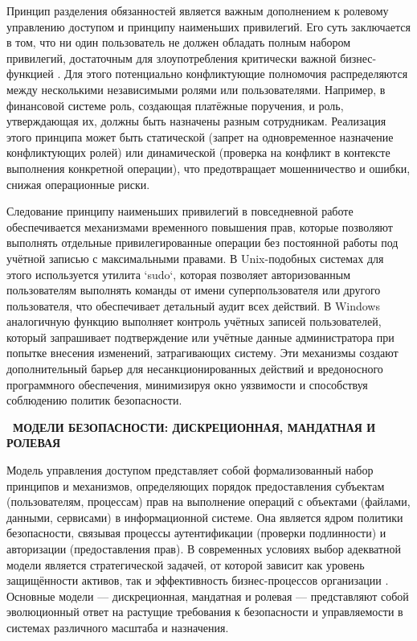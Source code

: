 \documentclass{SibFU-docs}
\begin{document}

Принцип разделения обязанностей является важным дополнением к ролевому управлению доступом и принципу наименьших привилегий. Его суть заключается в том, что ни один пользователь не должен обладать полным набором привилегий, достаточным для злоупотребления критически важной бизнес-функцией \cite{botha2004separation}. Для этого потенциально конфликтующие полномочия распределяются между несколькими независимыми ролями или пользователями. Например, в финансовой системе роль, создающая платёжные поручения, и роль, утверждающая их, должны быть назначены разным сотрудникам. Реализация этого принципа может быть статической (запрет на одновременное назначение конфликтующих ролей) или динамической (проверка на конфликт в контексте выполнения конкретной операции), что предотвращает мошенничество и ошибки, снижая операционные риски.


Следование принципу наименьших привилегий в повседневной работе обеспечивается механизмами временного повышения прав, которые позволяют выполнять отдельные привилегированные операции без постоянной работы под учётной записью с максимальными правами. В Unix-подобных системах для этого используется утилита `sudo`, которая позволяет авторизованным пользователям выполнять команды от имени суперпользователя или другого пользователя, что обеспечивает детальный аудит всех действий. В Windows аналогичную функцию выполняет контроль учётных записей пользователей, который запрашивает подтверждение или учётные данные администратора при попытке внесения изменений, затрагивающих систему. Эти механизмы создают дополнительный барьер для несанкционированных действий и вредоносного программного обеспечения, минимизируя окно уязвимости и способствуя соблюдению политик безопасности.

\newpage
{}
\begin{center}\textbf{\thesection\ МОДЕЛИ БЕЗОПАСНОСТИ: ДИСКРЕЦИОННАЯ, МАНДАТНАЯ И РОЛЕВАЯ}\end{center}
\vspace*{-1.5em}

Модель управления доступом представляет собой формализованный набор принципов и механизмов, определяющих порядок предоставления субъектам (пользователям, процессам) прав на выполнение операций с объектами (файлами, данными, сервисами) в информационной системе. Она является ядром политики безопасности, связывая процессы аутентификации (проверки подлинности) и авторизации (предоставления прав). В современных условиях выбор адекватной модели является стратегической задачей, от которой зависит как уровень защищённости активов, так и эффективность бизнес-процессов организации \cite{rt_solar_models_2023}. Основные модели — дискреционная, мандатная и ролевая — представляют собой эволюционный ответ на растущие требования к безопасности и управляемости в системах различного масштаба и назначения.
\end{document}
